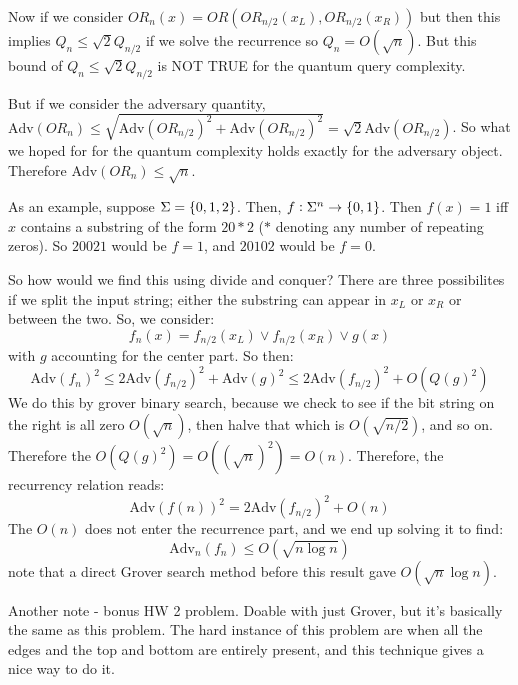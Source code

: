 Now if we consider $OR_n(x) = OR(OR_{n/2}(x_L), OR_{n/2}(x_R))$ but then this implies $Q_n \leq \sqrt{2}Q_{n/2}$ if we solve the recurrence so $Q_n = O(\sqrt{n})$. But this bound of $Q_n \leq \sqrt{2}Q_{n/2}$ is NOT TRUE for the quantum query complexity. 

But if we consider the adversary quantity, $\text{Adv}(OR_n) \leq \sqrt{\text{Adv}(OR_{n/2})^2 + \text{Adv}(OR_{n/2})^2} = \sqrt{2}\text{Adv}(OR_{n/2})$. So what we hoped for for the quantum complexity holds exactly for the adversary object. Therefore $\text{Adv}(OR_n) \leq \sqrt{n}$.

As an example, suppose $\Sigma = \set{0, 1, 2}$. Then, $f: \Sigma^n \to \set{0, 1}$. Then $f(x) = 1$ iff $x$ contains a substring of the form $20*2$ ($*$ denoting any number of repeating zeros). So $20021$ would be $f = 1$, and $20102$ would be $f = 0$. 

So how would we find this using divide and conquer? There are three possibilites if we split the input string; either the substring can appear in $x_L$ or $x_R$ or between the two. So, we consider:
\begin{equation}
    f_n(x) = f_{n/2}(x_L) \lor f_{n/2}(x_R) \lor g(x)
\end{equation}
with $g$ accounting for the center part. So then:
\begin{equation}
    \text{Adv}(f_n)^2 \leq 2 \text{Adv}(f_{n/2})^2 + \text{Adv}(g)^2 \leq 2\text{Adv}(f_{n/2})^2 + O(Q(g)^2)
\end{equation}
We do this by grover binary search, because we check to see if the bit string on the right is all zero $O(\sqrt{n})$, then halve that which is $O(\sqrt{n/2})$, and so on. Therefore the $O(Q(g)^2) = O((\sqrt{n})^2) = O(n)$. Therefore, the recurrency relation reads:
\begin{equation}
    \text{Adv}(f(n))^2 = 2\text{Adv}(f_{n/2})^2 + O(n)
\end{equation}
The $O(n)$ does not enter the recurrence part, and we end up solving it to find:
\begin{equation}
    \text{Adv}_n(f_n) \leq O(\sqrt{n\log n})
\end{equation}
note that a direct Grover search method before this result gave $O(\sqrt{n}\log n)$. 

Another note - bonus HW 2 problem. Doable with just Grover, but it's basically the same as this problem. The hard instance of this problem are when all the edges and the top and bottom are entirely present, and this technique gives a nice way to do it.

